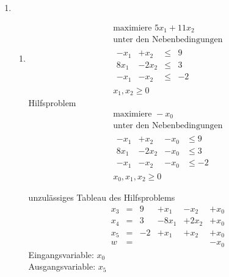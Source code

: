 \documentclass[a4paper]{scrartcl}
\begin{document}
\begin{enumerate}
    \item %
        \begin{enumerate}
            \item
                \begin{equation}
                    \begin{gathered}
                        \text{maximiere }
                        5x_1 +11x_2 \\
                        \text{unter den Nebenbedingungen} \\
                        \begin{array}{rrcr}
                            -x_1 & +x_2  & \leq & 9 \\
                            8x_1 & -2x_2 & \leq & 3 \\
                            -x_1 & -x_2  & \leq & -2
                        \end{array} \\
                        x_1, x_2 \geq 0
                    \end{gathered}
                \end{equation}
                Hilfsproblem
                \begin{equation}
                    \begin{gathered}
                        \text{maximiere }
                        -x_0 \\
                        \text{unter den Nebenbedingungen} \\
                        \begin{array}{rrrcr}
                            -x_1 & +x_2 & -x_0 & \leq 9 \\
                            8x_1 & -2x_2 & -x_0 & \leq 3 \\
                            -x_1 & -x_2 & -x_0 & \leq -2
                        \end{array} \\
                        x_0, x_1, x_2 \geq 0
                    \end{gathered}
                \end{equation}
                
                unzulässiges Tableau des Hilfsproblems
                \begin{equation}
                    \begin{array}{rcrrrr}
                        x_3 & = & 9 & +x_1 & -x_2 & +x_0 \\
                        x_4 & = & 3 & -8x_1 & +2x_2 & +x_0 \\
                        x_5 & = & -2 & +x_1 & +x_2 & +x_0 \\
                        \hline
                        w   & = & & & & -x_0
                    \end{array}
                \end{equation}
                Eingangsvariable: $x_0$ \\
                Ausgangsvariable: $x_5$ \\


\end{enumerate}
\end{enumerate}
\end{document}
